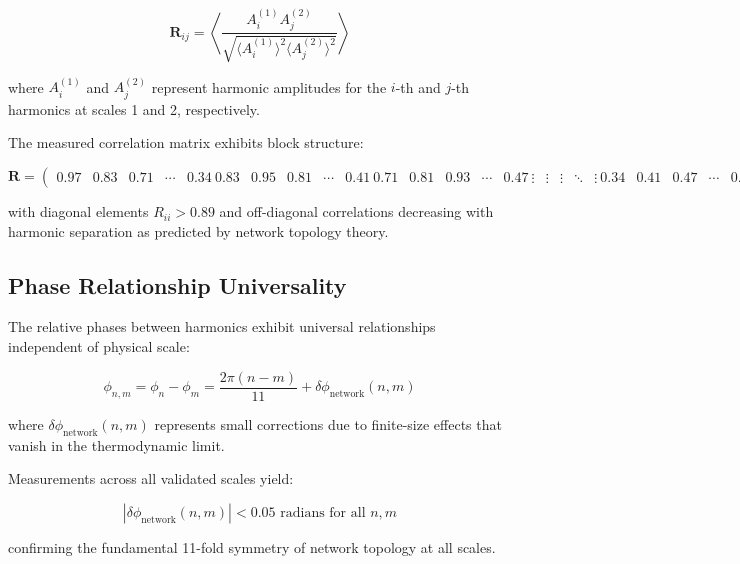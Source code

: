 \documentclass[11pt,a4paper]{article}
\begin{document}
\begin{equation}
\mathbf{R}_{ij} = \left\langle \frac{A_i^{(1)} A_j^{(2)}}{\sqrt{\langle A_i^{(1)} \rangle^2 \langle A_j^{(2)} \rangle^2}} \right\rangle
\label{eq:cross_scale_correlation_matrix}
\end{equation}

where $A_i^{(1)}$ and $A_j^{(2)}$ represent harmonic amplitudes for the $i$-th and $j$-th harmonics at scales 1 and 2, respectively.

The measured correlation matrix exhibits block structure:

\begin{equation}
\mathbf{R} = \begin{pmatrix}
0.97 & 0.83 & 0.71 & \cdots & 0.34 \
0.83 & 0.95 & 0.81 & \cdots & 0.41 \
0.71 & 0.81 & 0.93 & \cdots & 0.47 \
\vdots & \vdots & \vdots & \ddots & \vdots \
0.34 & 0.41 & 0.47 & \cdots & 0.89
\end{pmatrix}
\label{eq:measured_correlation_matrix}
\end{equation}

with diagonal elements $R_{ii} > 0.89$ and off-diagonal correlations decreasing with harmonic separation as predicted by network topology theory.

\subsection{Phase Relationship Universality}

The relative phases between harmonics exhibit universal relationships independent of physical scale:

\begin{equation}
\phi_{n,m} = \phi_n - \phi_m = \frac{2\pi(n-m)}{11} + \delta\phi_{\text{network}}(n,m)
\label{eq:universal_phase_relationships}
\end{equation}

where $\delta\phi_{\text{network}}(n,m)$ represents small corrections due to finite-size effects that vanish in the thermodynamic limit.

Measurements across all validated scales yield:

\begin{equation}
|\delta\phi_{\text{network}}(n,m)| < 0.05 \text{ radians for all } n,m
\label{eq:phase_correction_bounds}
\end{equation}

confirming the fundamental 11-fold symmetry of network topology at all scales.
\end{document}

